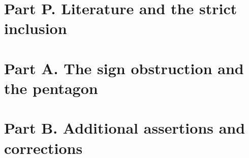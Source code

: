 \documentclass[11pt,a4paper]{article}
\begin{document}
\section{Part P. Literature and the strict inclusion}
\section{Part A. The sign obstruction and the pentagon}
\clearpage
\section{Part B. Additional assertions and corrections}


\end{document}
